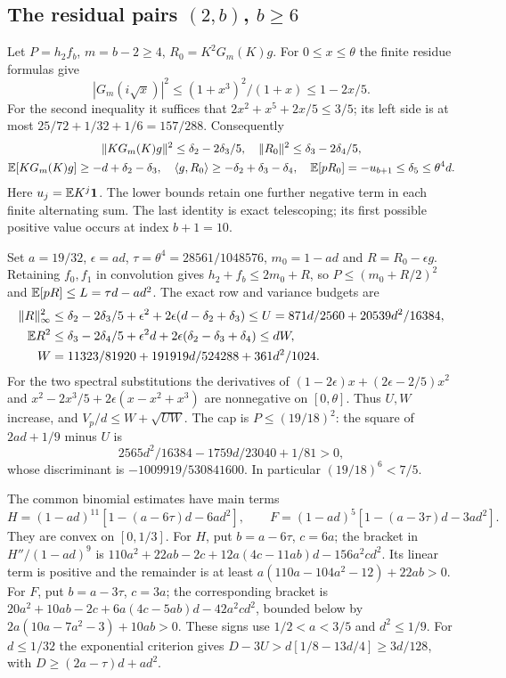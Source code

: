 \subsection[The residual pairs (2,b), b >= 6]{The residual pairs $(2,b)$, $b\ge6$}\label{loc:S5}
Let $P=h_2f_b$, $m=b-2\ge4$, $R_0=K^2G_m(K)g$.
For $0\le x\le\theta$ the finite residue formulas give
\[
 |G_m(i\sqrt x)|^2\le(1+x^3)^2/(1+x)\le1-2x/5.
\]
For the second inequality it suffices that
$2x^2+x^5+2x/5\le3/5$; its left side is at most
$25/72+1/32+1/6=157/288$.
Consequently
\begin{gather*}
 \|KG_m(K)g\|^2\le \delta_{2}-2\delta_{3}/5,\quad
 \|R_0\|^2\le \delta_{3}-2\delta_{4}/5,\\
 \mathbb E[KG_m(K)g]\ge-d+\delta_{2}-\delta_{3},\quad
 \langle g,R_0\rangle\ge-\delta_{2}+\delta_{3}-\delta_{4},\quad
 \mathbb E[pR_0]=-u_{b+1}\le \delta_{5}\le\theta^4d.
\end{gather*}
Here $u_j=\mathbb E K^j\mathbf1$. The lower bounds retain one further negative term in each finite
alternating sum. The last identity is exact telescoping; its first possible
positive value occurs at index $b+1=10$.

Set $a=19/32$, $\epsilon=ad$, $\tau=\theta^4=28561/1048576$,
$m_0=1-ad$ and $R=R_0-\epsilon g$.
Retaining $f_0,f_1$ in convolution gives
$h_2+f_b\le2m_0+R$, so $P\le(m_0+R/2)^2$ and
$\mathbb E[pR]\le L=\tau d-ad^2$.
The exact row and variance budgets are
\begin{align*}
 \|R\|_\infty^2&\le \delta_{2}-2\delta_{3}/5+\epsilon^2+2\epsilon(d-\delta_{2}+\delta_{3})
                       \le U=871d/2560+20539d^2/16384,\\
 \mathbb E R^2&\le \delta_{3}-2\delta_{4}/5+\epsilon^2d+2\epsilon(\delta_{2}-\delta_{3}+\delta_{4})\le dW,\\
 W&=11323/81920+191919d/524288+361d^2/1024.
\end{align*}
For the two spectral substitutions the derivatives of
$(1-2\epsilon)x+(2\epsilon-2/5)x^2$ and
$x^2-2x^3/5+2\epsilon(x-x^2+x^3)$ are nonnegative on $[0,\theta]$.
Thus $U,W$ increase, and $V_p/d\le W+\sqrt{UW}$.
The cap is $P\le(19/18)^2$: the square of $2ad+1/9$ minus $U$ is
\[
 2565d^2/16384-1759d/23040+1/81>0,
\]
whose discriminant is $-1009919/530841600$.
In particular $(19/18)^6<7/5$.

The common binomial estimates have main terms
\[
 H=(1-ad)^{11}[1-(a-6\tau)d-6ad^2],\qquad
 F=(1-ad)^5[1-(a-3\tau)d-3ad^2].
\]
They are convex on $[0,1/3]$. For $H$, put $b=a-6\tau$, $c=6a$;
the bracket in $H''/(1-ad)^9$ is
$110a^2+22ab-2c+12a(4c-11ab)d-156a^2cd^2$.
Its linear term is positive and the remainder is at least
$a(110a-104a^2-12)+22ab>0$.
For $F$, put $b=a-3\tau$, $c=3a$; the corresponding bracket is
$20a^2+10ab-2c+6a(4c-5ab)d-42a^2cd^2$,
bounded below by $2a(10a-7a^2-3)+10ab>0$.
These signs use $1/2<a<3/5$ and $d^2\le1/9$.
For $d\le1/32$ the exponential criterion gives
$D-3U>d[1/8-13d/4]\ge3d/128$, with
$D\ge(2a-\tau)d+ad^2$.

